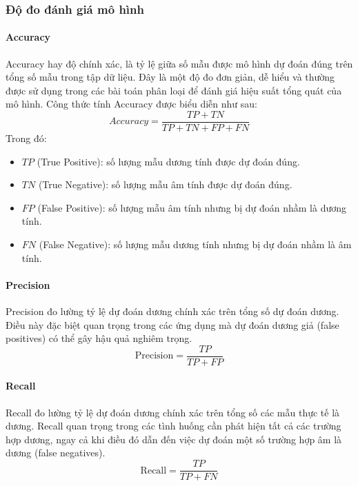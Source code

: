 \documentclass[10pt,twoside]{article}
\begin{document}
\subsubsection{Độ đo đánh giá mô hình} 
\paragraph{Accuracy} 
Accuracy \cite{grandini_metrics_2020} hay độ chính xác, là tỷ lệ giữa số mẫu được mô hình dự đoán đúng trên tổng số mẫu trong tập dữ liệu. Đây là một độ đo đơn giản, dễ hiểu và thường được sử dụng trong các bài toán phân loại để đánh giá hiệu suất tổng quát của mô hình. Công thức tính Accuracy được biểu diễn như sau: 
\begin{equation} Accuracy = \frac{TP + TN}{TP + TN + FP + FN} 
\end{equation} Trong đó: 
\begin{itemize} 
\item $TP$ (True Positive): số lượng mẫu dương tính được dự đoán đúng. 
\item $TN$ (True Negative): số lượng mẫu âm tính được dự đoán đúng. 
\item $FP$ (False Positive): số lượng mẫu âm tính nhưng bị dự đoán nhầm là dương tính. 
\item $FN$ (False Negative): số lượng mẫu dương tính nhưng bị dự đoán nhầm là âm tính. 
\end{itemize}
\paragraph{Precision} 
Precision \cite{grandini_metrics_2020} đo lường tỷ lệ dự đoán dương chính xác trên tổng số dự đoán dương. Điều này đặc biệt quan trọng trong các ứng dụng mà dự đoán dương giả (false positives) có thể gây hậu quả nghiêm trọng.
\begin{equation} 
\mathrm{Precision}=\frac{TP}{TP+FP}
\end{equation}
\paragraph{Recall} 
Recall \cite{grandini_metrics_2020} đo lường tỷ lệ dự đoán dương chính xác trên tổng số các mẫu thực tế là dương. Recall quan trọng trong các tình huống cần phát hiện tất cả các trường hợp dương, ngay cả khi điều đó dẫn đến việc dự đoán một số trường hợp âm là dương (false negatives).
\begin{equation} 
\mathrm{Recall}=\frac{TP}{TP+FN}
\end{equation}
\end{document}
